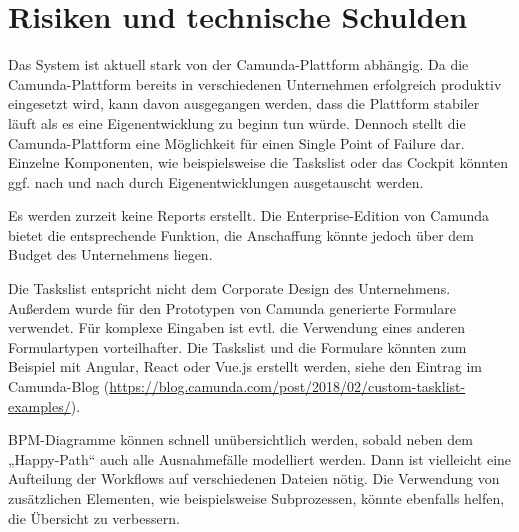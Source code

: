 \section{Risiken und technische Schulden}\label{section-technical-risks}

Das System ist aktuell stark von der Camunda-Plattform abhängig. Da die Camunda-Plattform bereits in verschiedenen Unternehmen erfolgreich produktiv eingesetzt wird, kann davon ausgegangen werden, dass die Plattform stabiler läuft als es eine Eigenentwicklung zu beginn tun würde. Dennoch stellt die Camunda-Plattform eine Möglichkeit für einen Single Point of Failure dar. Einzelne Komponenten, wie beispielsweise die Taskslist oder das Cockpit könnten ggf. nach und nach durch Eigenentwicklungen ausgetauscht werden.

Es werden zurzeit keine Reports erstellt. Die Enterprise-Edition von Camunda bietet die entsprechende Funktion, die Anschaffung könnte jedoch über dem Budget des Unternehmens liegen.

Die Taskslist entspricht nicht dem Corporate Design des Unternehmens. Außerdem wurde für den Prototypen von Camunda generierte Formulare verwendet. Für komplexe Eingaben ist evtl. die Verwendung eines anderen Formulartypen vorteilhafter. Die Taskslist und die Formulare könnten zum Beispiel mit Angular, React oder Vue.js erstellt werden, siehe den Eintrag im Camunda-Blog (\href{https://blog.camunda.com/post/2018/02/custom-tasklist-examples/}{https://blog.camunda.com/post/2018/02/custom-tasklist-examples/}).

BPM-Diagramme können schnell unübersichtlich werden, sobald neben dem „Happy-Path“ auch alle Ausnahmefälle modelliert werden. Dann ist vielleicht eine Aufteilung der Workflows auf verschiedenen Dateien nötig. Die Verwendung von zusätzlichen Elementen, wie beispielsweise Subprozessen, könnte ebenfalls helfen, die Übersicht zu verbessern.
